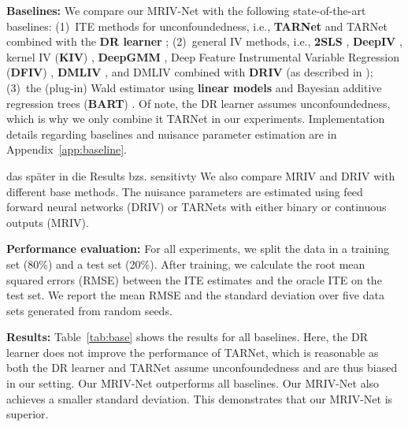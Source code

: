 \documentclass[nonatbib]{article}
\newcommand{\TODO}[1]{{\color{red}#1}}
\newcommand{\frameworkname}{MRIV\xspace}
\newcommand{\modelname}{\mbox{MRIV-Net}\xspace}
\theoremstyle{definition}
\theoremstyle{plain}
\begin{document}
\textbf{Baselines:}
We compare our \modelname with the following state-of-the-art baselines: (1)~ITE methods for unconfoundedness, i.e., \textbf{TARNet} \cite{Shalit.2017} and TARNet combined with the \textbf{DR learner} \cite{Kennedy.2020}; (2)~general IV methods, i.e., \textbf{2SLS} \cite{Wright.1928}, \textbf{DeepIV} \cite{Hartford.2017}, kernel IV (\textbf{KIV}) \cite{Singh.2019}, \textbf{DeepGMM} \cite{Bennett.2019}, Deep Feature Instrumental Variable Regression (\textbf{DFIV}) \cite{Xu.2021}, \textbf{DMLIV} \cite{Syrgkanis.2019}, and DMLIV combined with \textbf{DRIV} (as described in \cite{Syrgkanis.2019}); (3)~the (plug-in) Wald estimator using \textbf{linear models} and Bayesian additive regression trees (\textbf{BART}) \cite{Chipman.2010}. Of note, the DR learner assumes unconfoundedness, which is why we only combine it TARNet in our experiments. Implementation details regarding baselines and nuisance parameter estimation are in Appendix~\ref*{app:baseline}. 

\TODO{das später in die Results bzs. sensitivty} We also compare \frameworkname and DRIV with different base methods. The nuisance parameters are estimated using feed forward neural networks (DRIV) or TARNets with either binary or continuous outputs (MRIV).

\textbf{Performance evaluation:} For all experiments, we split the data in a training set (80\%) and a test set (20\%). After training, we calculate the root mean squared errors (RMSE) between the ITE estimates and the oracle ITE on the test set. We report the mean RMSE and the standard deviation over five data sets generated from random seeds.

\textbf{Results:}
Table~\ref{tab:base} shows the results for all baselines. Here, the DR learner does not improve the performance of TARNet, which is reasonable as both the DR learner and TARNet assume unconfoundedness and are thus biased in our setting. Our \modelname outperforms all baselines. Our \modelname also achieves a smaller standard deviation. This demonstrates that our \modelname is superior.
\end{document}
